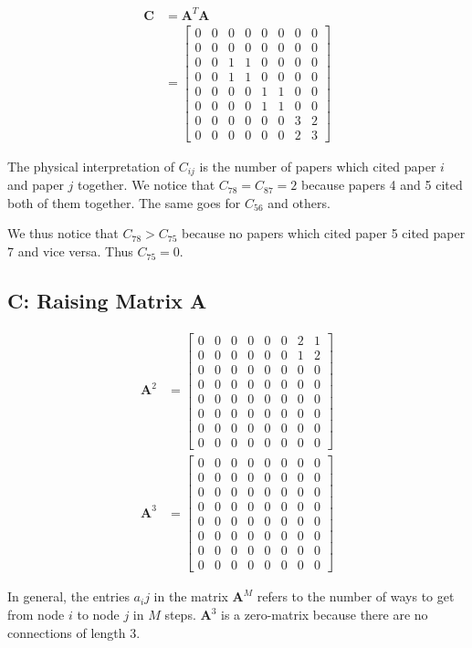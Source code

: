 \documentclass[]{article}
\begin{document}
\begin{align*}
	\mathbf{C} &= \mathbf{A}^T\mathbf{A} \\
		&= \begin{bmatrix}
			0 & 0 & 0 & 0 & 0 & 0 & 0 & 0 \\
			0 & 0 & 0 & 0 & 0 & 0 & 0 & 0 \\
			0 & 0 & 1 & 1 & 0 & 0 & 0 & 0 \\
			0 & 0 & 1 & 1 & 0 & 0 & 0 & 0 \\
			0 & 0 & 0 & 0 & 1 & 1 & 0 & 0 \\
			0 & 0 & 0 & 0 & 1 & 1 & 0 & 0 \\
			0 & 0 & 0 & 0 & 0 & 0 & 3 & 2 \\
			0 & 0 & 0 & 0 & 0 & 0 & 2 & 3
		\end{bmatrix}
\end{align*}

The physical interpretation of $C_{ij}$ is the number of papers which cited paper $i$ and paper $j$ together. We notice that $C_{78} = C_{87} = 2$ because papers 4 and 5 cited both of them together. The same goes for $C_{56}$ and others.

We thus notice that $C_{78} > C_{75}$ because no papers which cited paper 5 cited paper 7 and vice versa. Thus $C_{75} = 0$.

\subsection*{C: Raising Matrix A}

\begin{align*}
	\mathbf{A}^2 &= \begin{bmatrix}
		0 & 0 & 0 & 0 & 0 & 0 & 2 & 1 \\
		0 & 0 & 0 & 0 & 0 & 0 & 1 & 2 \\
		0 & 0 & 0 & 0 & 0 & 0 & 0 & 0 \\
		0 & 0 & 0 & 0 & 0 & 0 & 0 & 0 \\
		0 & 0 & 0 & 0 & 0 & 0 & 0 & 0 \\
		0 & 0 & 0 & 0 & 0 & 0 & 0 & 0 \\
		0 & 0 & 0 & 0 & 0 & 0 & 0 & 0 \\
		0 & 0 & 0 & 0 & 0 & 0 & 0 & 0
	\end{bmatrix} \\
	\mathbf{A}^3 &= \begin{bmatrix}
		0 & 0 & 0 & 0 & 0 & 0 & 0 & 0 \\
		0 & 0 & 0 & 0 & 0 & 0 & 0 & 0 \\
		0 & 0 & 0 & 0 & 0 & 0 & 0 & 0 \\
		0 & 0 & 0 & 0 & 0 & 0 & 0 & 0 \\
		0 & 0 & 0 & 0 & 0 & 0 & 0 & 0 \\
		0 & 0 & 0 & 0 & 0 & 0 & 0 & 0 \\
		0 & 0 & 0 & 0 & 0 & 0 & 0 & 0 \\
		0 & 0 & 0 & 0 & 0 & 0 & 0 & 0
	\end{bmatrix}
\end{align*}

In general, the entries $a_ij$ in the matrix $\mathbf{A}^M$ refers to the number of ways to get from node $i$ to node $j$ in $M$ steps. $\mathbf{A}^3$ is a zero-matrix because there are no connections of length 3. 

\newpage
\end{document}
